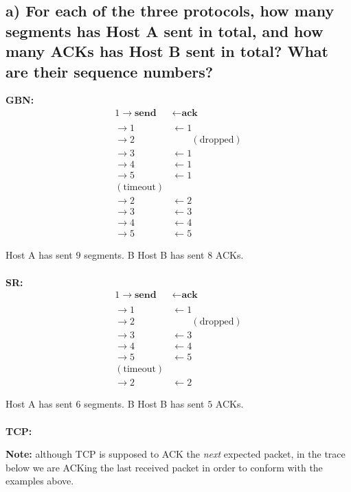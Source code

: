 \documentclass[12pt]{article}
\begin{document}
\subsection*{a) For each of the three protocols, how many segments has Host A sent in total, and how many ACKs has Host B sent in total? What are their sequence numbers?}

\textbf{GBN:} 
\begin{alignat*}{1}
\to \textbf{send} & \leftarrow \textbf{ack} \\ \\
\to 1 & \leftarrow 1 \\
\to 2 & \qquad (\text{dropped}) \\
\to 3 & \leftarrow 1 \\
\to 4 & \leftarrow 1 \\
\to 5 & \leftarrow 1 \\
(\text{timeout}) & \\
\to 2 & \leftarrow 2 \\
\to 3 & \leftarrow 3 \\
\to 4 & \leftarrow 4 \\
\to 5 & \leftarrow 5
\end{alignat*}

Host A has sent $9$ segments. B Host B has sent $8$ ACKs. \\ \\

\textbf{SR:}
\begin{alignat*}{1}
\to \textbf{send} & \leftarrow \textbf{ack} \\ \\
\to 1 & \leftarrow 1 \\
\to 2 & \qquad (\text{dropped}) \\
\to 3 & \leftarrow 3 \\
\to 4 & \leftarrow 4 \\
\to 5 & \leftarrow 5 \\
(\text{timeout}) & \\
\to 2 & \leftarrow 2
\end{alignat*}

Host A has sent $6$ segments. B Host B has sent $5$ ACKs. \\ \\

\textbf{TCP:}

\textbf{Note:} although TCP is supposed to ACK the \textit{next} expected packet, in the trace below we are ACKing the last received packet in order to conform with the examples above.
\end{document}
